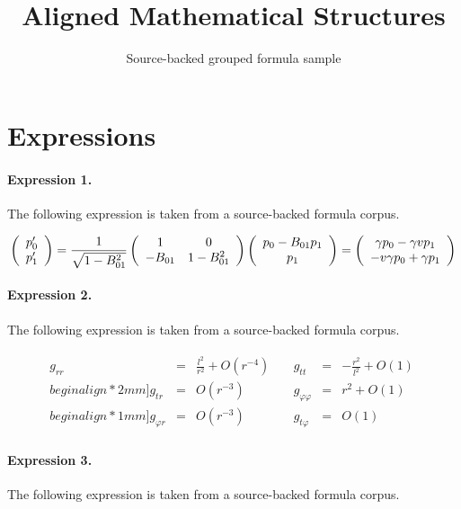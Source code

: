 \documentclass[11pt]{article}
\title{Aligned Mathematical Structures}
\author{Source-backed grouped formula sample}
\date{}
\begin{document}
\maketitle
\section{Expressions}
\paragraph{Expression 1.} The following expression is taken from a source-backed formula corpus.

\begin{align*}\left(\begin{array}{c}p'_{0} \\ p'_{1}\end{array}\right)={1\over\sqrt{1-B_{01}^{2}}} \left(\begin{array}{cc}1 & 0 \\-B_{01} & 1-B_{01}^{2}\end{array}\right) \left(\begin{array}{c}p_{0}-B_{01}p_{1} \\p_{1}\end{array}\right) =\left(\begin{array}{c}\gamma p_{0}-\gamma vp_{1} \\-v\gamma p_{0}+\gamma p_{1}\end{array}\right)\end{align*}

\paragraph{Expression 2.} The following expression is taken from a source-backed formula corpus.

\begin{align*}\begin{array}{lllllll}g_{rr} & = & \displaystyle \frac{l^{2}}{r^{2}}+O(r^{-4})\; & & g_{tt} & = & \displaystyle-\frac{r^{2} }{l^{2}}+O(1)\;\\begin{align*}2mm] g_{tr} & = & O(r^{-3})\; & & g_{\varphi \varphi } & = & r^{2}+O(1)\; \\begin{align*}1mm] g_{\varphi r} & = &O(r^{-3})\; & & g_{t\varphi } & = & O(1)\;\end{array}\end{align*}

\paragraph{Expression 3.} The following expression is taken from a source-backed formula corpus.
\end{document}
